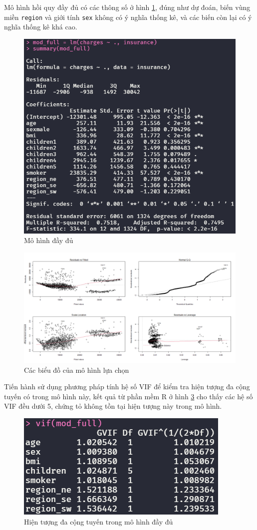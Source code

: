Mô hình hồi quy đầy đủ có các thông số ở hình \ref{fig-a1:model-full}, đúng như dự đoán, biến vùng miền \texttt{region} và giới tính \texttt{sex} không có ý nghĩa thống kê, và các biến còn lại có ý nghĩa thống kê khá cao.
\begin{figure}[H]
	\centering
	\includegraphics[width=0.7\linewidth]{images/A1/model-full}
	\caption{Mô hình đầy đủ}
	\label{fig-a1:model-full}
\end{figure}

\begin{figure}[H]
	\centering
	\includegraphics[width=0.8\linewidth]{images/A1/model-full-plot}
	\caption{Các biểu đồ của mô hình lựa chọn}
	\label{fig-a1:model-full-plot}
\end{figure}

Tiến hành sử dụng phương pháp tính hệ số VIF để kiểm tra hiện tượng đa cộng tuyến có trong mô hình này, kết quả từ phần mềm R ở hình \ref{fig-a1:model-full-vif} cho thấy các hệ số VIF đều dưới 5, chứng tỏ không tồn tại hiện tượng này trong mô hình.
\begin{figure}[H]
	\centering
	\includegraphics[width=0.5\linewidth]{images/A1/model-full-vif}
	\caption{Hiện tượng đa cộng tuyến trong mô hình đầy đủ}
	\label{fig-a1:model-full-vif}
\end{figure}

